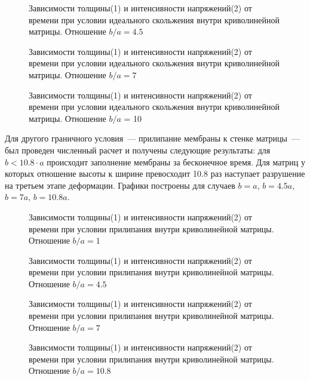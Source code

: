 		\begin{figure}[h!]	
				\def\svgwidth{\columnwidth}
				\caption{Зависимости толщины(1) и интенсивности напряжений(2) от времени при условии идеального скольжения внутри криволинейной матрицы. Отношение $b/a = 4.5$} 
				\label{vert_sliging_4ba}
		\end{figure}
				\begin{figure}[h!]	
				\def\svgwidth{\columnwidth}
				\caption{Зависимости толщины(1) и интенсивности напряжений(2) от времени при условии идеального скольжения внутри криволинейной матрицы. Отношение $b/a = 7$} 
				\label{vert_sliging_7ba}
		\end{figure}
				\begin{figure}[h!]	
				\def\svgwidth{\columnwidth}
				\caption{Зависимости толщины(1) и интенсивности напряжений(2) от времени при условии идеального скольжения внутри криволинейной матрицы. Отношение $b/a$ = 10} 
				\label{vert_sliging_10ba}
		\end{figure}

Для другого граничного условия~--- прилипание мембраны к стенке матрицы~--- был проведен численный расчет и получены следующие результаты:
для \linebreak$b<10.8\cdot a$ происходит заполнение мембраны за бесконечное время. Для матриц у которых отношение высоты к ширине превосходит
10.8 раз наступает разрушение на третьем этапе деформации. Графики построены для случаев $b=a$, $b=4.5a$, $b=7a$, $b=10.8a$.
 
						 
		\begin{figure}[h!]	
				\def\svgwidth{\columnwidth}
				\caption{Зависимости толщины(1) и интенсивности напряжений(2) от времени при условии прилипания внутри криволинейной матрицы. Отношение $b/a = 1$} 
				\label{vert_stick_ba}
		\end{figure}

		\begin{figure}[h!]	
				\def\svgwidth{\columnwidth}
				\caption{Зависимости толщины(1) и интенсивности напряжений(2) от времени при условии прилипания внутри криволинейной матрицы. Отношение $b/a = 4.5$} 
				\label{vert_stick_4ba}
		\end{figure}
				\begin{figure}[h!]	
				\def\svgwidth{\columnwidth}
				\caption{Зависимости толщины(1) и интенсивности напряжений(2) от времени при условии прилипания внутри криволинейной матрицы. Отношение $b/a = 7$ }
				\label{vert_stick_7ba}
		\end{figure}
				\begin{figure}[h!]	
				\def\svgwidth{\columnwidth}
				\caption{Зависимости толщины(1) и интенсивности напряжений(2) от времени при условии прилипания внутри криволинейной матрицы. Отношение $b/a = 10.8$} 
				\label{vert_stick_10ba}
		\end{figure}

